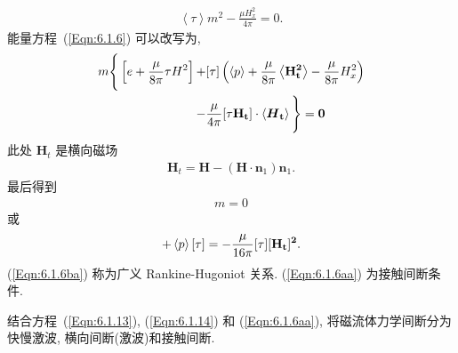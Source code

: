 \documentclass[10.5pt
]{article}
\begin{document}
\begin{align}
\left<\tau\right> m^2 - \frac{\mu H_x^2}{4\pi} = 0.\label{Eqn:6.1.14}
\end{align}
能量方程~(\ref{Eqn:6.1.6}) 可以改写为,
\begin{align}
m \Bigg\{ \left[ e + \frac{\mu}{8\pi} \tau H^2 \right] +& [\tau] \left( \left<p\right>
+
\frac{\mu}{8\pi} \left<\bf H_t^2\right> - \frac{\mu}{8\pi} H_x^2 \right)
\nonumber\\
-& \frac{\mu}{4\pi} [\tau \bf H_t] \cdot \left< \boldsymbol{H}_t \right> \Bigg\} = 0
\end{align}
此处 $\boldsymbol{H}_t$ 是横向磁场
\begin{eqnarray*}
\boldsymbol{H}_t = \boldsymbol{H} - (\boldsymbol{H} \cdot \boldsymbol{n}_1) \boldsymbol{n}_1.
\end{eqnarray*}
最后得到
\begin{align}
m = 0\label{Eqn:6.1.6aa}
\end{align}
或
\begin{align}
[e] + \left<p\right>[\tau] = -\frac{\mu}{16\pi} [\tau][\bf H_t]^2.\label{Eqn:6.1.6ba}
\end{align}
(\ref{Eqn:6.1.6ba}) 称为广义 Rankine-Hugoniot 关系. (\ref{Eqn:6.1.6aa}) 为接触间断条件.

结合方程~(\ref{Eqn:6.1.13}), (\ref{Eqn:6.1.14}) 和 (\ref{Eqn:6.1.6aa}),
将磁流体力学间断分为快慢激波, 横向间断(激波)和接触间断.
\end{document}

